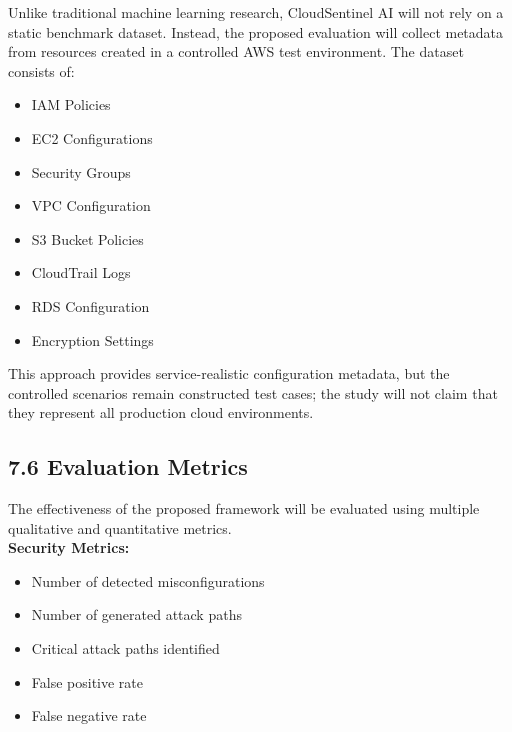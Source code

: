Unlike traditional machine learning research, CloudSentinel AI will not rely on a static benchmark dataset. Instead, the proposed evaluation will collect metadata from resources created in a controlled AWS test environment. The dataset consists of:

\begin{itemize}
\tightlist
\item
  IAM Policies\\
\item
  EC2 Configurations\\
\item
  Security Groups\\
\item
  VPC Configuration\\
\item
  S3 Bucket Policies\\
\item
  CloudTrail Logs\\
\item
  RDS Configuration\\
\item
  Encryption Settings
\end{itemize}

This approach provides service-realistic configuration metadata, but the controlled scenarios remain constructed test cases; the study will not claim that they represent all production cloud environments.

\subsection{7.6 Evaluation Metrics}

The effectiveness of the proposed framework will be evaluated using multiple qualitative and quantitative metrics.\\
\textbf{Security Metrics:}

\begin{itemize}
\tightlist
\item
  Number of detected misconfigurations\\
\item
  Number of generated attack paths\\
\item
  Critical attack paths identified\\
\item
  False positive rate\\
\item
  False negative rate
\end{itemize}

